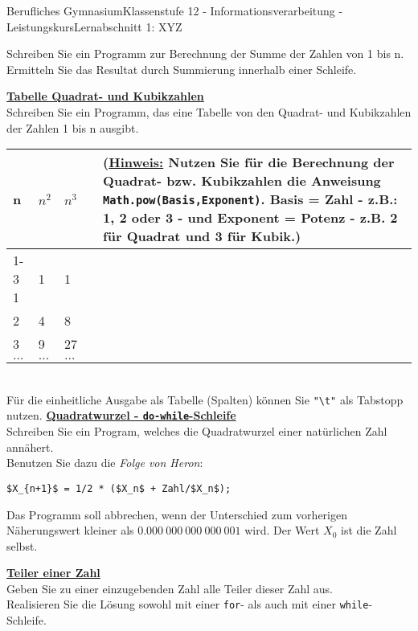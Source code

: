 \documentclass[oneside,openany,headings=optiontotoc,11pt,numbers=noenddot]{scrreprt}
\begin{document}
\begin{worksheet}{Berufliches Gymnasium}{Klassenstufe 12 - Informationsverarbeitung - Leistungskurs}{Lernabschnitt 1: XYZ}
\begin{framed}
			Schreiben Sie ein Programm zur Berechnung der Summe der Zahlen von 1 bis n.\\
			Ermitteln Sie das Resultat durch Summierung innerhalb einer Schleife.\\
			\par\bigskip\noindent
			\textbf{\underline{Tabelle Quadrat- und Kubikzahlen}}\\
			Schreiben Sie ein Programm, das eine Tabelle von den Quadrat- und Kubikzahlen der Zahlen 1 bis n ausgibt.
			\par\noindent
			\begin{tabularx}{\textwidth}{llllX}
				n & \(n^2\) & \(n^3\) & &  \multirow{5}{0.75\textwidth}{(\underline{Hinweis:} Nutzen Sie für die Berechnung der Quadrat- bzw. Kubikzahlen die Anweisung \lstinline[style=JavaInputStyle]{Math.pow(Basis,Exponent)}. Basis = Zahl - z.B.: 1, 2 oder 3 - und Exponent = Potenz - z.B. 2 für Quadrat und 3 für Kubik.)}\\
				\cline{1-3}
				1 & 1 & 1 & &\\
				2 & 4 & 8 & &\\
				3 & 9 & 27& &\\
				\(\ldots\) & \(\ldots\) & \(\ldots\) & &
			\end{tabularx}\\
			Für die einheitliche Ausgabe als Tabelle (Spalten) können Sie \lstinline[style=JavaInputStyle]{"\t"} als Tabstopp nutzen.
			\newpage\noindent
			\textbf{\underline{Quadratwurzel - \lstinline[style=JavaInputStyle]{do-while}-Schleife}}\\
			Schreiben Sie ein Program, welches die Quadratwurzel einer natürlichen Zahl annähert.\\
			Benutzen Sie dazu die \textit{Folge von Heron}:
			\begin{lstlisting}[style=JavaInputStyle,mathescape=true]
				$X_{n+1}$ = 1/2 * ($X_n$ + Zahl/$X_n$);
			\end{lstlisting}
			Das Programm soll abbrechen, wenn der Unterschied zum vorherigen Näherungswert kleiner als \(0.000\ 000\ 000\ 000\ 001\) wird. Der Wert \(X_0\) ist die Zahl selbst.\\
			\par\bigskip\noindent
			\textbf{\underline{Teiler einer Zahl}}\\
			Geben Sie zu einer einzugebenden Zahl alle Teiler dieser Zahl aus.\\Realisieren Sie die Lösung sowohl mit einer \lstinline[style=JavaInputStyle]{for}- als auch mit einer \lstinline[style=JavaInputStyle]{while}-Schleife.
		\end{framed}
	\end{worksheet}
\end{document}
